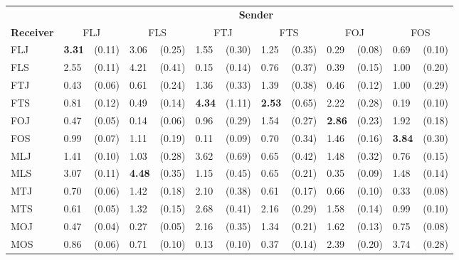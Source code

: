 
\begin{tabular}{ll@{\,\,\,}rl@{\,\,\,}rl@{\,\,\,}rl@{\,\,\,}rl@{\,\,\,}rl@{\,\,\,}r}
\toprule
    & \multicolumn{12}{c}{\textbf{Sender}} \\
    \cmidrule(lr){2- 13 }
\textbf{Receiver}
    & \multicolumn{2}{c}{\textnormal{FLJ}}
    & \multicolumn{2}{c}{\textnormal{FLS}}
    & \multicolumn{2}{c}{\textnormal{FTJ}}
    & \multicolumn{2}{c}{\textnormal{FTS}}
    & \multicolumn{2}{c}{\textnormal{FOJ}}
    & \multicolumn{2}{c}{\textnormal{FOS}} \\
    \cmidrule(lr){1-1}
    \cmidrule(lr){2-3}
    \cmidrule(lr){4-5}
    \cmidrule(lr){6-7}
    \cmidrule(lr){8-9}
    \cmidrule(lr){10-11}
    \cmidrule(lr){12-13}
    \textnormal{FLJ} & \textbf{3.31} & (0.11) & 3.06 & (0.25) & 1.55 & (0.30) & 1.25 & (0.35) & 0.29 & (0.08) & 0.69 & (0.10) \\
    \textnormal{FLS} & 2.55 & (0.11) & 4.21 & (0.41) & 0.15 & (0.14) & 0.76 & (0.37) & 0.39 & (0.15) & 1.00 & (0.20) \\
    \textnormal{FTJ} & 0.43 & (0.06) & 0.61 & (0.24) & 1.36 & (0.33) & 1.39 & (0.38) & 0.46 & (0.12) & 1.00 & (0.29) \\
    \textnormal{FTS} & 0.81 & (0.12) & 0.49 & (0.14) & \textbf{4.34} & (1.11) & \textbf{2.53} & (0.65) & 2.22 & (0.28) & 0.19 & (0.10) \\
    \textnormal{FOJ} & 0.47 & (0.05) & 0.14 & (0.06) & 0.96 & (0.29) & 1.54 & (0.27) & \textbf{2.86} & (0.23) & 1.92 & (0.18) \\
    \textnormal{FOS} & 0.99 & (0.07) & 1.11 & (0.19) & 0.11 & (0.09) & 0.70 & (0.34) & 1.46 & (0.16) & \textbf{3.84} & (0.30) \\
    \textnormal{MLJ} & 1.41 & (0.10) & 1.03 & (0.28) & 3.62 & (0.69) & 0.65 & (0.42) & 1.48 & (0.32) & 0.76 & (0.15) \\
    \textnormal{MLS} & 3.07 & (0.11) & \textbf{4.48} & (0.35) & 1.15 & (0.45) & 0.65 & (0.21) & 0.35 & (0.09) & 1.48 & (0.14) \\
    \textnormal{MTJ} & 0.70 & (0.06) & 1.42 & (0.18) & 2.10 & (0.38) & 0.61 & (0.17) & 0.66 & (0.10) & 0.33 & (0.08) \\
    \textnormal{MTS} & 0.61 & (0.05) & 1.32 & (0.15) & 2.68 & (0.41) & 2.16 & (0.29) & 1.58 & (0.14) & 0.99 & (0.10) \\
    \textnormal{MOJ} & 0.47 & (0.04) & 0.27 & (0.05) & 2.16 & (0.35) & 1.34 & (0.21) & 1.62 & (0.13) & 0.75 & (0.08) \\
    \textnormal{MOS} & 0.86 & (0.06) & 0.71 & (0.10) & 0.13 & (0.10) & 0.37 & (0.14) & 2.39 & (0.20) & 3.74 & (0.28) \\
\end{tabular}

